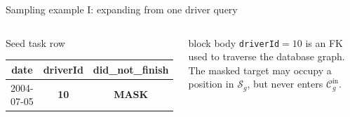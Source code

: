\documentclass[aspectratio=169,10pt,t]{beamer}
\begin{document}

\begin{frame}{Sampling example I: expanding from one driver query}
  \vspace{.02cm}
  \begin{columns}[c,onlytextwidth]
      \begin{alertblock}{Seed task row}
        \centering
        {\fontsize{6.9}{8.0}\selectfont
        \setlength{\tabcolsep}{2.6pt}
        \renewcommand{\arraystretch}{1.25}
        \begin{tabular}{ccc}
          \toprule
          \textbf{date} & \textbf{driverId} & \textbf{did\_not\_finish} \\
          \midrule
          2004-07-05 & \bfseries 10 & \color{Red}\bfseries MASK \\
          \bottomrule
        \end{tabular}}
      \end{alertblock}

      \vspace{.18cm}
      \begin{beamercolorbox}[sep=.58em,wd=\linewidth]{block body}
        \small
        \texttt{driverId}$=10$ is an FK used to traverse the database graph.
        The masked target may occupy a position in $\mathcal S_g$, but never enters $\mathcal C_g^{\mathrm{in}}$.
      \end{beamercolorbox}

      \centering


\end{columns}
\end{frame}
\end{document}
